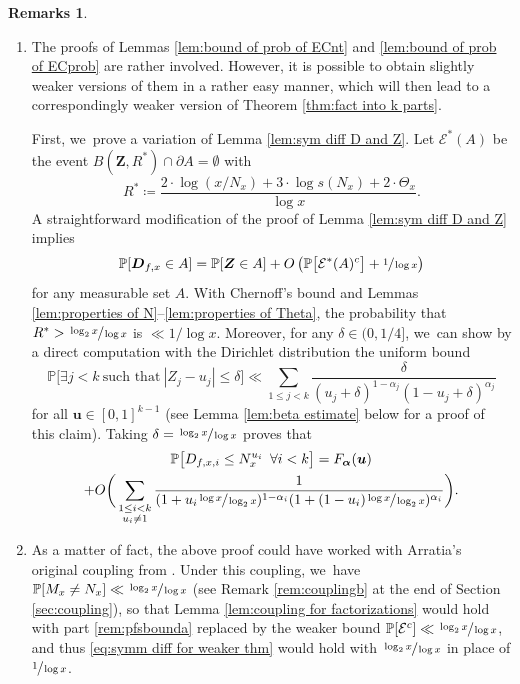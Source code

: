\documentclass[JEP,XML,SOM,Unicode,published]{cedram}
\newenvironment{enumeratea}
{\bgroup\def\theenumi{\alph{enumi}}\begin{enumerate}}
{\end{enumerate}\egroup}
\newcommand{\bu}{{\boldsymbol u}}
\newcommand{\bD}{{\boldsymbol D}}
\newcommand{\bZ}{{\boldsymbol Z}}
\newcommand{\PP}{\mathbb{P}}
\newcommand{\boldalpha}{\boldsymbol{\alpha}}
\newcommand{\EC}{\mathcal{E}}
\newcommand{\bg}{\big}
\newcommand{\bgg}{\Big}
\newcommand{\bggg}{\bigg}
\theoremstyle{plain}
\theoremstyle{definition}
\newtheorem*{remss}{Remarks}
\begin{document}
\skpt
\begin{remss}
\begin{enumeratea}
\item\label{rem:pfsbounda}
The proofs of Lemmas \ref{lem:bound of prob of ECnt} and \ref{lem:bound of prob of ECprob} are rather involved. However, it is possible to obtain slightly weaker versions of them in a rather easy manner, which will then lead to a correspondingly weaker version of Theorem \ref{thm:fact into k parts}.

First, we~prove a variation of Lemma \ref{lem:sym diff D and Z}. Let $\EC^*(A)$ be the event $B(\bZ,R^*)\cap \partial A=\emptyset$ with
\[
R^* \coloneqq \frac{2\cdot \log(x/N_x) + 3\cdot \log s(N_x) + 2\cdot \Theta_x}{\log x}.
\]
A straightforward modification of the proof of Lemma \ref{lem:sym diff D and Z} implies
\begin{equation}
\label{eq:symm diff for weaker thm}
\PP[\bD_{f, x} \in A] = \PP[\bZ \in A] + O\left(\PP\bg[\EC^*(A)^c\bg] + \sfrac{1}{\log x}\right)
\end{equation}
for any measurable set $A$. With Chernoff's bound and Lemmas \ref{lem:properties of N}--\ref{lem:properties of Theta}, the probability that $R^*>\sfrac{\log_2 x}{\log x}$ is $\ll 1/\log x$. Moreover, for any $\delta\in(0,1/4]$, we~can show by a direct computation with the Dirichlet distribution the uniform bound
\[
\PP\bgg[\exists j < k\ \text{such that}\ |Z_j-u_j|\le \delta \bgg] \ll \sum_{1\le j<k} \frac{\delta}{(u_j+\delta)^{1-\alpha_j}(1-u_j+\delta)^{\alpha_j}}
\]
for all $\bu\in [0,1]^{k-1}$ (see Lemma \ref{lem:beta estimate} below for a proof of this claim). Taking \hbox{$\delta=\sfrac{\log_2x}{\log x}$} proves that
\begin{multline*}
\PP\bg[D_{f,x,i} \le N_x^{u_i}\ \, \forall i < k\bg] = F_{\boldalpha}(\bu) \\
+ O\bggg(\sum_{\substack{1 \le i < k \\ u_i \ne 1}} \frac{1}{(1+u_i\sfrac{\log x}{\log_2x})^{1-\alpha_i}(1+(1-u_i)\sfrac{\log x}{\log_2x})^{\alpha_i}}\bggg).
\end{multline*}

\item\label{rem:pfsboundb}
As a matter of fact, the above proof could have worked with Arratia's original coupling from \cite{Arratia02}. Under this coupling, we~have $\PP[M_x \ne N_x] \ll \sfrac{\log_2x}{\log x}$ (see Remark \eqref{rem:couplingb} at the end of Section \ref{sec:coupling}), so that Lemma \ref{lem:coupling for factorizations} would hold with part \eqref{rem:pfsbounda} replaced by the weaker bound $\PP[\EC^c]\ll \sfrac{\log_2x}{\log x}$, and thus \eqref{eq:symm diff for weaker thm} would hold with $\sfrac{\log_2x}{\log x}$ in place of $\sfrac{1}{\log x}$.
\end{enumeratea}
\end{remss}
\end{document}
